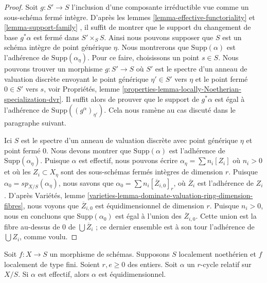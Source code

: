 \begin{proof} 
Soit  $g : S' \to S$  l'inclusion d'une composante irréductible vue 
comme un sous-schéma fermé intègre. D'après les 
lemmes  \ref{lemma-effective-functoriality}  et  \ref{lemma-support-family} ,
 il suffit de montrer que le support du changement de base  
$g^*\alpha$  est fermé dans $S' \times_S S$. 
Ainsi nous pouvons supposer que  $S$  est un schéma intègre de point générique  
$\eta$. Nous montrerons que  $\text{Supp}(\alpha)$  est l'adhérence 
de  $\text{Supp}(\alpha_\eta)$. Pour ce faire, choisissons un point  $s \in S$. 
Nous pouvons trouver un morphisme  $g : S' \to S$  où  $S'$  est le spectre 
d'un anneau de valuation discrète envoyant le point générique  $\eta' \in S'$  vers $\eta$
  et le point fermé  $0 \in S'$  vers  $s$, voir
 Propriétés, lemme \ref{properties-lemma-locally-Noetherian-specialization-dvr}. 
Il suffit alors de prouver que le support de  $g^*\alpha$
  est égal à l'adhérence de  $\text{Supp}((g^\alpha)_{\eta'})$.
 Cela nous ramène au cas discuté dans le paragraphe suivant. 

\medskip\noindent
 Ici  $S$  est le spectre d'un anneau de valuation discrète avec point 
générique  $\eta$  et point fermé  $0$. Nous devons montrer que 
$\text{Supp}(\alpha)$  est l'adhérence de  $\text{Supp}(\alpha_\eta)$. 
Puisque  $\alpha$  est effectif, nous pouvons écrire  $\alpha_\eta = \sum n_i[Z_i]$
  où  $n_i > 0$  et où les  $Z_i \subset X_\eta$ sont des sous-schémas fermés intègres de dimension  $r$. 
Puisque  $\alpha_0 = sp_{X/S}(\alpha_\eta)$, nous savons que 
$\alpha_0 = \sum n_i [\overline{Z}_{i, 0}]_r$, où  $\overline{Z}_i$
  est l'adhérence de  $Z_i$. D'après Variétés, lemme 
\ref{varieties-lemma-dominate-valuation-ring-dimension-fibres}, nous
 voyons que  $\overline{Z}_{i, 0}$  est équidimensionnel de dimension $r$. 
Puisque  $n_i > 0$, nous en concluons que  $\text{Supp}(\alpha_0)$
  est égal à l'union des  $\overline{Z}_{i, 0}$. Cette union
 est la fibre au-dessus de  $0$  de $\bigcup \overline{Z}_i$ ; ce dernier ensemble
 est à son tour l'adhérence de  $\bigcup Z_i$, comme voulu. 
\end{proof} 

\begin{lemma} 
\label{lemma-effective-equidimensional} 
Soit  $f : X \to S$  un morphisme de schémas. Supposons  $S$  localement noethérien
 et  $f$  localement de type fini. Soient  $r, e \geq 0$  des entiers. 
Soit  $\alpha$  un  $r$-cycle relatif sur  $X/S$.
 Si $\alpha$  est effectif, alors  $\alpha$  est équidimensionnel. 
\end{lemma} 

